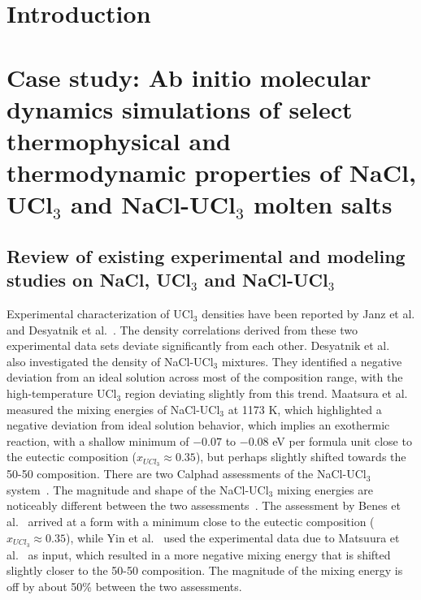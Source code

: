 \documentclass[titlepage=firstiscover,11pt,fleqn,headheight=14pt,footheight=40.8pt]{scrreprt}
\begin{document}
\large
{}\large

\title{}

\date{Predicting thermodynamic and thermophysical properties of molten chloride salts from ab-initio molecular dynamics simulations}

\maketitle

\tableofcontents

\chapter{Introduction}

\chapter{Case study: Ab initio molecular dynamics simulations of select thermophysical and thermodynamic properties of NaCl, UCl$_3$ and NaCl-UCl$_3$ molten salts}
\label{sec:NaCl}

\section{Review of existing experimental and modeling studies on NaCl, UCl$_3$ and NaCl-UCl$_3$}
Experimental characterization of UCl$_3$ densities have been reported by Janz et al.\cite{Janz1988} and Desyatnik et al.~\cite{Desyatnik}. The density correlations derived from these two experimental data sets deviate significantly from each other. Desyatnik et al.~\cite{Desyatnik} also investigated the density of NaCl-UCl$_3$ mixtures. They identified a negative deviation from an ideal solution across most of the composition range, with the high-temperature UCl$_3$ region deviating slightly from this trend. 
Maatsura et al.~\cite{Matsuura} measured the mixing energies of NaCl-UCl$_3$ at 1173 K, which highlighted a negative deviation from ideal solution behavior, which implies an exothermic reaction, with a shallow minimum of $-0.07$ to $-0.08$ eV per formula unit close to the eutectic composition ($x_{UCl_3}\approx 0.35$), but perhaps slightly shifted towards the 50-50 composition. There are two Calphad assessments of the NaCl-UCl$_3$ system~\cite{BENES2008, YIN2020}. The magnitude and shape of the NaCl-UCl$_3$ mixing energies are noticeably different between the two assessments~\cite{YIN2020}. The assessment by Benes et al.~\cite{BENES2008} arrived at a form with a minimum close to the eutectic composition ($x_{UCl_3}\approx 0.35$), while Yin et al.~\cite{YIN2020} used the experimental data due to Matsuura et al.~\cite{Matsuura} as input, which resulted in a more negative mixing energy that is shifted slightly closer to the 50-50 composition. The magnitude of the mixing energy is off by about 50\% between the two assessments. 
\end{document}
